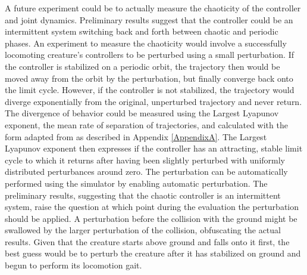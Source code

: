 \documentclass[main]{subfiles}
\begin{document}
A future experiment could be to actually measure the chaoticity of the controller and joint dynamics. %
%
Preliminary results suggest that the controller could be an intermittent system switching back and forth between chaotic and periodic phases. %
%
An experiment to measure the chaoticity would involve a successfully locomoting creature's controllers to be perturbed using a small perturbation. %
%
If the controller is stabilized on a periodic orbit, the trajectory then would be moved away from the orbit by the perturbation, but finally converge back onto the limit cycle. %
%
However, if the controller is not stabilized, the trajectory would diverge exponentially from the original, unperturbed trajectory and never return. %
%
The divergence of behavior could be measured using the Largest Lyapunov exponent, the mean rate of separation of trajectories, and calculated with the form adapted from \cite{bib:Rosenstein1993} as described in Appendix \ref{AppendixA}. %
%
The Largest Lyapunov exponent then expresses if the controller has an attracting, stable limit cycle to which it returns after having been slightly perturbed with uniformly distributed perturbances around zero. %
%
The perturbation can be automatically performed using the simulator by enabling automatic perturbation. %
%
The preliminary results, suggesting that the chaotic controller is an intermittent system, raise the question at which point during the evaluation the perturbation should be applied. %
%
A perturbation before the collision with the ground might be swallowed by the larger perturbation of the collision, obfuscating the actual results. %
%
Given that the creature starts above ground and falls onto it first, the best guess would be to perturb the creature after it has stabilized on ground and begun to perform its locomotion gait. 
\end{document}
